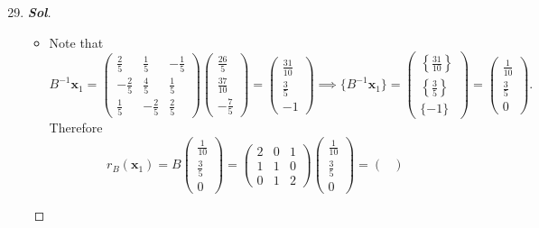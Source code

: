 \begin{enumerate}
	\setcounter{enumi}{28}
	\item\begin{proof}[\normalfont\color{magenta}\bfseries Sol]
		\begin{itemize}
			\item[($\mathbf x_1$)] Note that \[
			B^{-1}\mathbf x_1
			=
			\begin{pmatrix}
				\frac25&\frac15&-\frac15\\
				-\frac25&\frac45&\frac15\\
				\frac15&-\frac25&\frac25
			\end{pmatrix}
			\begin{pmatrix}
				\frac{26}{5}\\[2pt]
				\frac{37}{10}\\[2pt]
				-\frac75
			\end{pmatrix}
			=
			\begin{pmatrix}
				\frac{31}{10}\\[2pt]
				\frac35\\[2pt]
				-1
			\end{pmatrix}\implies
			\bigl\{B^{-1}\mathbf x_1\bigr\}
			=
			\begin{pmatrix}
				\left\{\frac{31}{10}\right\}\\[2pt]
				\left\{\frac35\right\}\\[2pt]
				\{-1\}
			\end{pmatrix}
			=
			\begin{pmatrix}
				\frac1{10}\\[2pt]
				\frac35\\[2pt]
				0
			\end{pmatrix}.
			\]
			Therefore
			\[
			r_B(\mathbf x_1)
			=
			B
			\begin{pmatrix}
				\frac1{10}\\[2pt]
				\frac35\\[2pt]
				0
			\end{pmatrix}
			=
			\begin{pmatrix}
				2&0&1\\
				1&1&0\\
				0&1&2
			\end{pmatrix}
			\begin{pmatrix}
				\frac1{10}\\[2pt]
				\frac35\\[2pt]
				0
			\end{pmatrix}
			=
			\begin{pmatrix}

\end{pmatrix}\]
\end{itemize}
\end{proof}
\end{enumerate}
